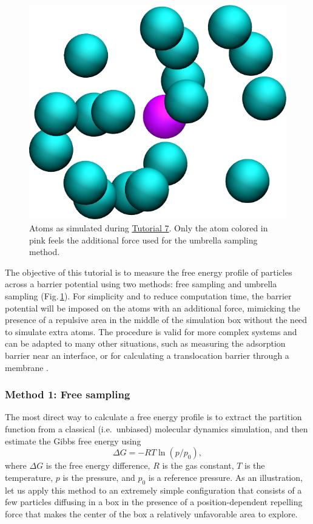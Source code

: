\documentclass[9pt,tutorial]{livecoms}
\begin{document}
\begin{figure}
\centering
\includegraphics[width=0.55\linewidth]{US}
\caption{Atoms as simulated during \hyperref[umbrella-sampling-label]{Tutorial 7}.
Only the atom colored in pink feels the additional force used for the umbrella
sampling method.}
\label{fig:US}
\end{figure}

\noindent The objective of this tutorial is to measure the free energy profile
of particles across a barrier potential using two methods: free sampling and
umbrella sampling \cite{kastner2011umbrella, allen2017computer, frenkel2023understanding} (Fig.\,\ref{fig:US}).
For simplicity and to reduce computation time, the barrier potential will be
imposed on the atoms with an additional force, mimicking the presence of a repulsive
area in the middle of the simulation box without the need to simulate extra atoms.
The procedure is valid for more complex systems and can be adapted to many other
situations, such as measuring the adsorption barrier near an interface, or for
calculating a translocation barrier through a membrane
\cite{wilson1997adsorption, makarov2009computer, gravelle2021adsorption}.

\subsubsection{Method 1: Free sampling}
The most direct way to calculate a free energy profile is to extract the partition
function from a classical (i.e.~unbiased) molecular dynamics simulation, and
then estimate the Gibbs free energy using
\begin{equation}
\Delta G = -RT \ln(p/p_0),
\label{eq:G}
\end{equation}
where $\Delta G$ is the free energy difference, $R$ is the gas constant, $T$
is the temperature, $p$ is the pressure, and $p_0$ is a reference pressure.
As an illustration, let us apply this method to an extremely simple configuration
that consists of a few particles diffusing in a box in the presence of a
position-dependent repelling force that makes the center of the box a relatively
unfavorable area to explore.
\end{document}

